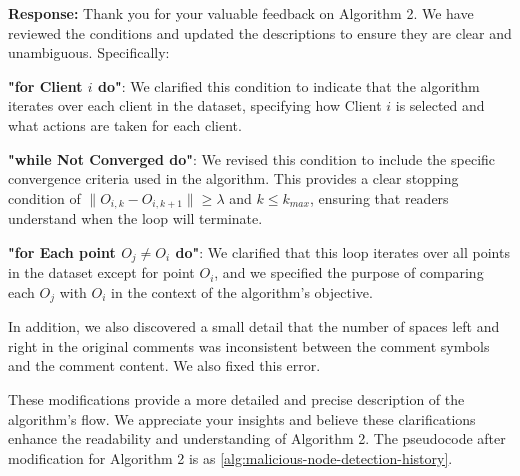 \documentclass[a4paper,twoside,11pt,dvipsnames]{reviewresponse}
\begin{document}

\textbf{Response:} Thank you for your valuable feedback on Algorithm 2. We have reviewed the conditions and updated the descriptions to ensure they are clear and unambiguous. Specifically:

\textbf{"for Client $i$ do"}: We clarified this condition to indicate that the algorithm iterates over each client in the dataset, specifying how Client $i$ is selected and what actions are taken for each client.

\textbf{"while Not Converged do"}: We revised this condition to include the specific convergence criteria used in the algorithm. This provides a clear stopping condition of $\|O_{i,k}-O_{i,k+1}\|\geq \lambda$ and $k\leq k_{max}$, ensuring that readers understand when the loop will terminate.

\textbf{"for Each point $O_j \neq O_i$ do"}: We clarified that this loop iterates over all points in the dataset except for point $O_i$, and we specified the purpose of comparing each $O_j$ with $O_i$ in the context of the algorithm’s objective.


In addition, we also discovered a small detail that the number of spaces left and right in the original comments was inconsistent between the comment symbols and the comment content. We also fixed this error.

These modifications provide a more detailed and precise description of the algorithm’s flow. We appreciate your insights and believe these clarifications enhance the readability and understanding of Algorithm 2.
The pseudocode after modification for Algorithm 2 is as \ref{alg:malicious-node-detection-history}.
\end{document}
